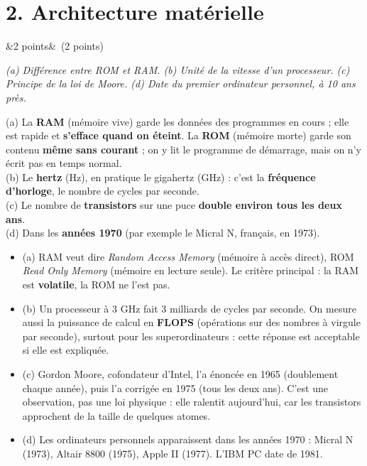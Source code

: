 \documentclass[11pt, a4paper]{exam}
\newcommand{\Q}[3]{\par\needspace{5\baselineskip}\bigskip\noindent{\large\bfseries Question #1}\ifx&#2&\else\ \textnormal{(#2)}\fi\par\nopagebreak\smallskip\noindent\textit{#3}\par\nopagebreak\smallskip}
\begin{document}
\section*{2. Architecture matérielle}

\Q{4}{2 points}{(a) Différence entre ROM et RAM. (b) Unité de la vitesse d'un processeur. (c) Principe de la loi de Moore. (d) Date du premier ordinateur personnel, à 10 ans près.}
\begin{reponse}
(a) La \textbf{RAM} (mémoire vive) garde les données des programmes en cours ; elle est rapide et \textbf{s'efface quand on éteint}. La \textbf{ROM} (mémoire morte) garde son contenu \textbf{même sans courant} ; on y lit le programme de démarrage, mais on n'y écrit pas en temps normal. \\
(b) Le \textbf{hertz} (Hz), en pratique le gigahertz (GHz) : c'est la \textbf{fréquence d'horloge}, le nombre de cycles par seconde. \\
(c) Le nombre de \textbf{transistors} sur une puce \textbf{double environ tous les deux ans}. \\
(d) Dans les \textbf{années 1970} (par exemple le Micral N, français, en 1973).
\end{reponse}
\begin{itemize}
\item (a) RAM veut dire \emph{Random Access Memory} (mémoire à accès direct), ROM \emph{Read Only Memory} (mémoire en lecture seule). Le critère principal : la RAM est \textbf{volatile}, la ROM ne l'est pas.
\item (b) Un processeur à 3 GHz fait 3 milliards de cycles par seconde. On mesure aussi la puissance de calcul en \textbf{FLOPS} (opérations sur des nombres à virgule par seconde), surtout pour les superordinateurs : cette réponse est acceptable si elle est expliquée.
\item (c) Gordon Moore, cofondateur d'Intel, l'a énoncée en 1965 (doublement chaque année), puis l'a corrigée en 1975 (tous les deux ans). C'est une observation, pas une loi physique : elle ralentit aujourd'hui, car les transistors approchent de la taille de quelques atomes.
\item (d) Les ordinateurs personnels apparaissent dans les années 1970 : Micral N (1973), Altair 8800 (1975), Apple II (1977). L'IBM PC date de 1981.
\end{itemize}
\end{document}
